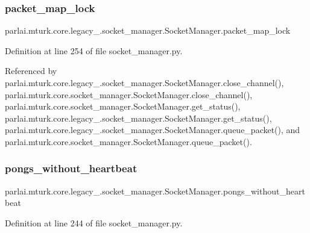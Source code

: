 \subsubsection{\texorpdfstring{packet\+\_\+map\+\_\+lock}{packet\_map\_lock}}
{\footnotesize\ttfamily parlai.\+mturk.\+core.\+legacy\+\_.\+socket\+\_\+manager.\+Socket\+Manager.\+packet\+\_\+map\+\_\+lock}



Definition at line 254 of file socket\+\_\+manager.\+py.



Referenced by parlai.\+mturk.\+core.\+legacy\+\_.\+socket\+\_\+manager.\+Socket\+Manager.\+close\+\_\+channel(), parlai.\+mturk.\+core.\+socket\+\_\+manager.\+Socket\+Manager.\+close\+\_\+channel(), parlai.\+mturk.\+core.\+socket\+\_\+manager.\+Socket\+Manager.\+get\+\_\+status(), parlai.\+mturk.\+core.\+legacy\+\_.\+socket\+\_\+manager.\+Socket\+Manager.\+get\+\_\+status(), parlai.\+mturk.\+core.\+legacy\+\_.\+socket\+\_\+manager.\+Socket\+Manager.\+queue\+\_\+packet(), and parlai.\+mturk.\+core.\+socket\+\_\+manager.\+Socket\+Manager.\+queue\+\_\+packet().

\mbox{\label{classparlai_1_1mturk_1_1core_1_1legacy__2018_1_1socket__manager_1_1SocketManager_aa440819d20eb90b0a6b33fde4b742d10}} 
\subsubsection{\texorpdfstring{pongs\+\_\+without\+\_\+heartbeat}{pongs\_without\_heartbeat}}
{\footnotesize\ttfamily parlai.\+mturk.\+core.\+legacy\+\_.\+socket\+\_\+manager.\+Socket\+Manager.\+pongs\+\_\+without\+\_\+heartbeat}



Definition at line 244 of file socket\+\_\+manager.\+py.



